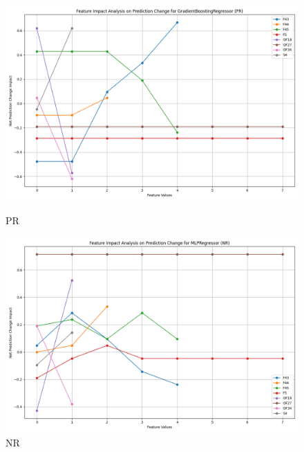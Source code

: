 \begin{figure}[H]
    \centering
    \begin{minipage}{0.495\textwidth}
        \centering
        \includegraphics[width=\linewidth]{analysis/images_reg/feature_impact_prediction_change_PR_GradientBoostingRegressor.png}
        \caption{PR}
        \label{fig:pr_class_analysis_reg}
    \end{minipage}\hfill
    \begin{minipage}{0.495\textwidth}
        \centering
        \includegraphics[width=\linewidth]{analysis/images_reg/feature_impact_prediction_change_NR_MLPRegressor.png}
        \caption{NR}
        \label{fig:nr_class_analysis_reg}
    \end{minipage}
\end{figure}

